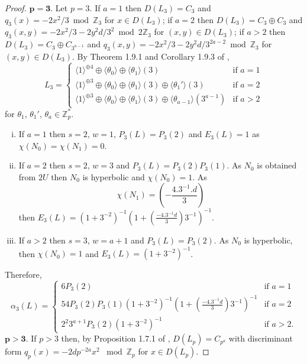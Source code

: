 \documentclass[12pt, a4paper]{article}
\newcommand{\ZZ}{\mathbb{Z}}
\newcommand{\la}{\langle}
\newcommand{\ra}{\rangle}
\newcommand{\op}{\oplus}
\begin{document}
\begin{proof}
  \noindent $\mathbf{p=3.}$
  Let $p=3$.
  If $a=1$ then 
  $D(L_3)=C_3$ and $q_3(x) = -2x^2/3 \bmod{\ZZ_3}$ for $x \in D(L_3)$;
  if $a=2$ then $D(L_3) = C_3 \op C_3$ and $q_3(x,y) = -2x^2/3   -2y^2d/3^2 \bmod{ 2 \ZZ_3}$ for $(x,y) \in D(L_3)$;  
  if $a>2$ then $D(L_3)=C_3 \op C_{3^{a-1}}$ and $q_3(x,y) = -2x^2/3  -2y^2 d/3^{2a-2} \bmod{\ZZ_3}$ for $(x,y) \in D(L_3)$.
  By Theorem 1.9.1 and  Corollary 1.9.3 of \cite{Nikulin},
  \begin{equation*}
    L_3 =
    \begin{cases}
      \la 1 \ra^{\op 4} \op \la \theta_0 \ra \op \la \theta_1 \ra (3) & \text{if $a=1$} \\
      \la 1 \ra^{\op 3} \op \la \theta_0 \ra \op \la \theta_1 \ra (3) \op \la \theta_1' \ra (3) & \text{if $a=2$} \\
      \la 1 \ra^{\op 3} \op \la \theta_0 \ra \op \la \theta_1 \ra (3) \op  \la \theta_{a-1} \ra (3^{a-1}) & \text{if $a>2$}
    \end{cases}
  \end{equation*}
  for $\theta_1$, $\theta_1'$, $\theta_a \in \ZZ_p^*$.
\begin{enumerate}[(i)]
\item  If $a=1$ then $s=2$, $w=1$, $P_3(L) = P_3(2)$ and $E_3(L)=1$ as $\chi(N_0)=\chi(N_1)=0$.
  \item  If $a=2$ then $s=2$, $w=3$ and $P_3(L) = P_3(2) P_3(1)$.
    As $N_0$ is obtained from $2U$ then $N_0$ is hyperbolic and $\chi(N_0)=1$. 
    As 
\[
    \chi(N_1)= 
    \left ( - \frac{4.3^{-1}.d}{3} \right )
  \] 
  then $E_3(L) = (1+3^{-2})^{-1} (1 + ( \frac{-4.3^{-1}d}{3} )3^{-1} )^{-1}$.
\item If $a>2$ then $s=3$, $w=a+1$ and $P_3(L) = P_3(2)$.
  As $N_0$ is hyperbolic, then $\chi(N_0)=1$ and $E_3(L) = (1 + 3^{-2})^{-1}$.
\end{enumerate}
Therefore, 
\begin{equation}\label{alpha_3L}
    \alpha_3(L) =
    \begin{cases}
      6 P_3(2) & \text{if $a=1$}\\
      54 P_3(2) P_3(1) (1 + 3^{-2})^{-1} (1 + ( \frac{-4.3^{-1} d }{3} ) 3^{-1})^{-1} & \text{if $a=2$} \\
      2^2 3^{a+1} P_3(2) (1+3^{-2})^{-1} & \text{if $a>2$.} 
    \end{cases}
  \end{equation}
\noindent $\mathbf{p>3.}$ If $p>3$ then, by Proposition 1.7.1 of \cite{Nikulin}, $D(L_p) = C_{p^a}$ with discriminant form $q_p(x)=-2dp^{-2a}x^2$ $\bmod{ \ZZ_p}$ for $x \in D(L_p)$.

\end{proof}
\end{document}
